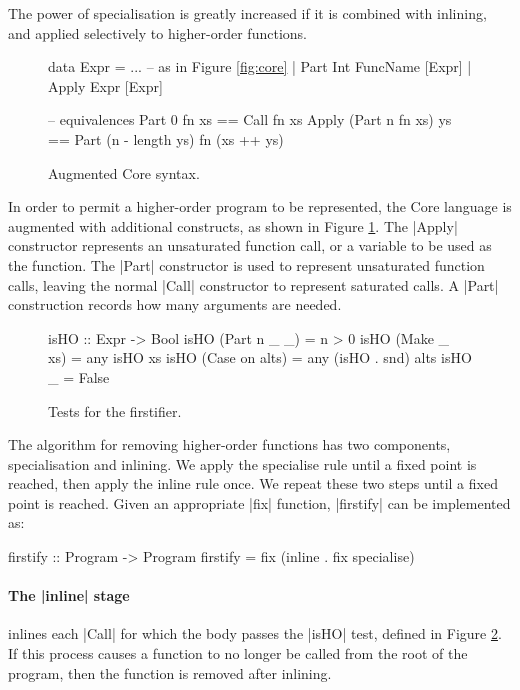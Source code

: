The power of specialisation is greatly increased if it is combined with inlining, and applied selectively to higher-order functions.

\begin{figure}
\ignore\begin{code}
data Expr  =  ... -- as in Figure {\ref{fig:core}}
           |  Part   Int FuncName [Expr]
           |  Apply  Expr [Expr]

-- equivalences
Part 0 fn xs == Call fn xs
Apply (Part n fn xs) ys == Part (n - length ys) fn (xs ++ ys)
\end{code}
\caption{Augmented Core syntax.}
\label{fig:core_ho}
\end{figure}

In order to permit a higher-order program to be represented, the Core language is augmented with additional constructs, as shown in Figure \ref{fig:core_ho}. The |Apply| constructor represents an unsaturated function call, or a variable to be used as the function. The |Part| constructor is used to represent unsaturated function calls, leaving the normal |Call| constructor to represent saturated calls. A |Part| construction records how many arguments are needed.

\begin{figure}
\ignore\begin{code}
isHO :: Expr -> Bool
isHO (Part n _ _)    = n > 0
isHO (Make _ xs)     = any isHO xs
isHO (Case on alts)  = any (isHO . snd) alts
isHO _               = False
\end{code}
\caption{Tests for the firstifier.}
\label{fig:isHO}
\end{figure}

The algorithm for removing higher-order functions has two components, specialisation and inlining. We apply the specialise rule until a fixed point is reached, then apply the inline rule once. We repeat these two steps until a fixed point is reached. Given an appropriate |fix| function, |firstify| can be implemented as:

\ignore\begin{code}
firstify :: Program -> Program
firstify = fix (inline . fix specialise)
\end{code}

\paragraph{The |inline| stage} inlines each |Call| for which the body passes the |isHO| test, defined in Figure \ref{fig:isHO}. If this process causes a function to no longer be called from the root of the program, then the function is removed after inlining.

